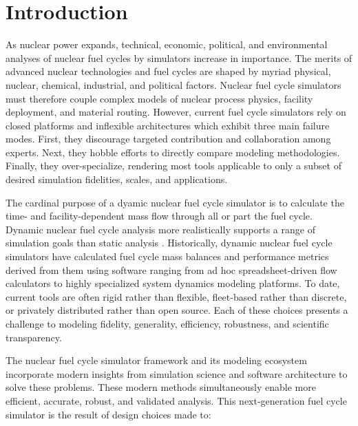 
\section{Introduction}



As nuclear power expands, technical, economic, political, and environmental
analyses of nuclear fuel cycles by simulators increase in importance. The
merits of advanced nuclear technologies and fuel cycles are
shaped by myriad physical, nuclear, chemical, industrial, and political
factors. Nuclear fuel cycle simulators must therefore couple complex models of
nuclear process physics, facility deployment, and material routing. However,
current fuel cycle simulators rely on closed platforms and inflexible
architectures which exhibit three main failure modes. First, they discourage
targeted contribution and collaboration among experts. Next, they hobble
efforts to directly compare modeling methodologies. Finally, they
over-specialize, rendering most tools applicable to only a subset of desired
simulation fidelities, scales, and applications.

The cardinal purpose of a dyamic nuclear fuel cycle simulator is to calculate
the time- and facility-dependent mass flow through all or part the fuel cycle.
Dynamic nuclear fuel cycle analysis more realistically supports a range of
simulation goals than static analysis \cite{piet_dynamic_2011}. Historically,
dynamic nuclear fuel cycle simulators have calculated fuel cycle mass balances
and performance metrics derived from them using software ranging from ad hoc
spreadsheet-driven flow calculators to highly specialized system dynamics
modeling platforms. To date, current tools are often rigid rather than flexible,
fleet-based rather than discrete, or privately distributed rather than open
source. Each of these choices presents a challenge to modeling fidelity,
generality, efficiency, robustness, and scientific transparency.

The \Cyclus nuclear fuel cycle simulator framework and its modeling ecosystem
incorporate modern insights from simulation science and software architecture
to solve these problems.  These modern methods simultaneously enable more
efficient, accurate, robust, and validated analysis.  This next-generation fuel
cycle simulator is the result of design choices made to:


